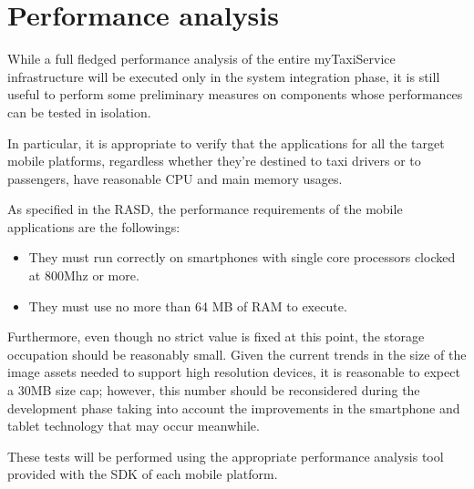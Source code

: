 \chapter{Performance analysis}
While a full fledged performance analysis of the entire myTaxiService infrastructure will be executed only in the system integration phase, it is still useful to perform some preliminary measures on components whose performances can be tested in isolation.

In particular, it is appropriate to verify that the applications for all the target mobile platforms, regardless whether they're destined to taxi drivers or to passengers, have reasonable CPU and main memory usages. 

As specified in the RASD, the performance requirements of the mobile applications are the followings:
\begin{itemize}
	\item They must run correctly on smartphones with single core processors clocked at 800Mhz or more.
	\item They must use no more than 64 MB of RAM to execute.
\end{itemize}

Furthermore, even though no strict value is fixed at this point, the storage occupation should be reasonably small. Given the current trends in the size of the image assets needed to support high resolution devices, it is reasonable to expect a 30MB size cap; however, this number should be reconsidered during the development phase taking into account the improvements in the smartphone and tablet technology that may occur meanwhile.

These tests will be performed using the appropriate performance analysis tool provided with the SDK of each mobile platform. 
